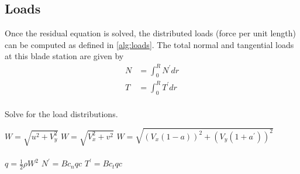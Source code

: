 \documentclass{article}
\begin{document}


\subsection{Loads}

Once the residual equation is solved, the distributed loads (force per unit length) can be computed as defined in \cref{alg:loads}.  The total normal and tangential loads at this blade station are given by
\begin{equation}
\begin{aligned}
    N &= \int_0^R N^\prime dr\\
    T &= \int_0^R T^\prime dr\\
\end{aligned}
\end{equation}
%
%
%


\begin{algorithm}[htbp]
\caption{Solve for the load distributions.}
\begin{algorithmic}
\State $W = \sqrt{u^2 + V_y^2}$
\State $W = \sqrt{V_x^2 + v^2}$
\Else
\State $W = \sqrt{(V_x(1 - a))^2 + (V_y(1 + a^\prime))^2}$
\EndIf
\\
\\
\State $q = \frac{1}{2}\rho W^2$
\State $N^\prime = B c_n q c$
\State $T^\prime = B c_t q c$

\end{algorithmic}
\label{alg:loads}
\end{algorithm}





\end{document}
